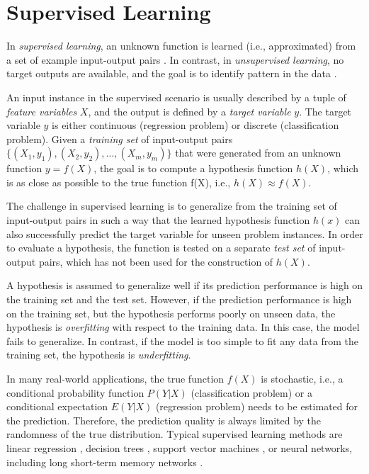 \section{Supervised Learning}

In \textit{supervised learning}, an unknown function is learned (i.e., approximated) from a set of example input-output pairs \cite{DBLP:books/daglib/0023820}.
In contrast, in \textit{unsupervised learning}, no target outputs are available, and the goal is to identify pattern in the data \cite{DBLP:conf/ac/Ghahramani03}.

An input instance in the supervised scenario is usually described by a tuple of \textit{feature variables} $X$, and the output is defined by a \textit{target variable} $y$.
The target variable $y$ is either continuous (regression problem) or discrete (classification problem).
Given a \textit{training set} of input-output pairs $\{(X_1, y_1), (X_2, y_2), \dots, (X_m,y_m)\}$ that were generated from an unknown function $y = f(X)$, the goal is to compute a hypothesis function $h(X)$, which is as close as possible to the true function f(X), i.e., $h(X) \approx f(X)$.

The challenge in supervised learning is to generalize from the training set of input-output pairs in such a way that the learned hypothesis function $h(x)$ can also successfully predict the target variable for unseen problem instances.
In order to evaluate a hypothesis, the function is tested on a separate \textit{test set} of input-output pairs, which has not been used for the construction of $h(X)$.

A hypothesis is assumed to generalize well if its prediction performance is high on the training set and the test set.
However, if the prediction performance is high on the training set, but the hypothesis performs poorly on unseen data, the hypothesis is \textit{overfitting} with respect to the training data.
In this case, the model fails to generalize.
In contrast, if the model is too simple to fit any data from the training set, the hypothesis is \textit{underfitting}.

In many real-world applications, the true function $f(X)$ is stochastic, i.e., a conditional probability function $P(Y | X)$ (classification problem) or a conditional expectation $E(Y | X)$ (regression problem) needs to be estimated for the prediction.
Therefore, the prediction quality is always limited by the randomness of the true distribution.
Typical supervised learning methods are linear regression \cite{galton1886regression}, decision trees \cite{DBLP:journals/ml/Quinlan86}, support vector machines \cite{DBLP:journals/ml/CortesV95}, or neural networks, including long short-term memory networks \cite{DBLP:journals/neco/HochreiterS97}.

